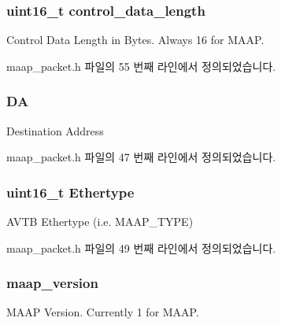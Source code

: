 \subsubsection[{\texorpdfstring{control\+\_\+data\+\_\+length}{control_data_length}}]{\setlength{\rightskip}{0pt plus 5cm}uint16\+\_\+t control\+\_\+data\+\_\+length}\hypertarget{struct_m_a_a_p___packet_acc7cd70455e6e455ac498477b95f9e21}{}\label{struct_m_a_a_p___packet_acc7cd70455e6e455ac498477b95f9e21}
Control Data Length in Bytes. Always 16 for M\+A\+AP. 

maap\+\_\+packet.\+h 파일의 55 번째 라인에서 정의되었습니다.

\subsubsection[{\texorpdfstring{DA}{DA}}]{ DA}\hypertarget{struct_m_a_a_p___packet_acb85280d2eab3ae8bc045112037a565d}{}\label{struct_m_a_a_p___packet_acb85280d2eab3ae8bc045112037a565d}
Destination Address 

maap\+\_\+packet.\+h 파일의 47 번째 라인에서 정의되었습니다.

\subsubsection[{\texorpdfstring{Ethertype}{Ethertype}}]{\setlength{\rightskip}{0pt plus 5cm}uint16\+\_\+t Ethertype}\hypertarget{struct_m_a_a_p___packet_a1a9102ebc02a8e42299ec477781088cd}{}\label{struct_m_a_a_p___packet_a1a9102ebc02a8e42299ec477781088cd}
A\+V\+TB Ethertype (i.\+e. {\ttfamily M\+A\+A\+P\+\_\+\+T\+Y\+PE}) 

maap\+\_\+packet.\+h 파일의 49 번째 라인에서 정의되었습니다.

\subsubsection[{\texorpdfstring{maap\+\_\+version}{maap_version}}]{ maap\+\_\+version}\hypertarget{struct_m_a_a_p___packet_a67dab883e86b903bfbffb8e4c25829b9}{}\label{struct_m_a_a_p___packet_a67dab883e86b903bfbffb8e4c25829b9}
M\+A\+AP Version. Currently 1 for M\+A\+AP. 

